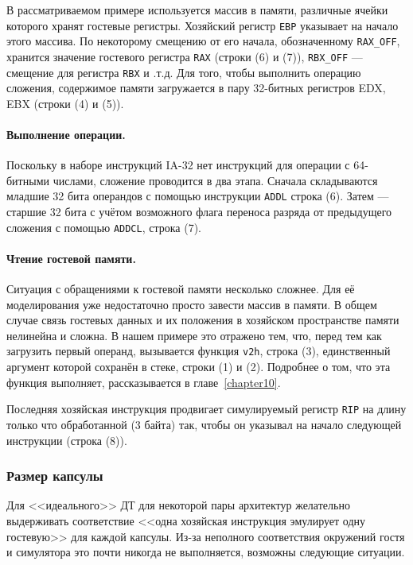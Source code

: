 В рассматриваемом примере используется массив в памяти, различные ячейки которого хранят гостевые регистры. Хозяйский регистр \texttt{EBP} указывает на начало этого массива. По некоторому смещению от его начала, обозначенному \texttt{RAX_OFF}, хранится значение гостевого регистра \texttt{RAX} (строки (6) и (7)), \texttt{RBX_OFF} --- смещение для регистра \texttt{RBX} и .т.д. Для того, чтобы выполнить операцию сложения, содержимое памяти загружается в пару 32-битных регистров EDX, EBX (строки (4) и (5)). 

\paragraph{Выполнение операции.}
Поскольку в наборе инструкций IA-32 нет инструкций для операции с 64-битными числами, сложение проводится в два этапа. Сначала складываются младшие 32 бита операндов с помощью инструкции \texttt{ADDL} строка (6). Затем --- старшие 32 бита с учётом возможного флага переноса разряда от предыдущего сложения с помощью \texttt{ADDCL}, строка (7).

\paragraph{Чтение гостевой памяти.}

Ситуация с обращениями к гостевой памяти несколько сложнее. Для её моделирования уже недостаточно просто завести массив в памяти. В общем случае связь гостевых данных и их положения в хозяйском пространстве памяти нелинейна и сложна. В нашем примере это отражено тем, что, перед тем как загрузить первый операнд, вызывается функция \texttt{v2h}, строка (3), единственный аргумент которой сохранён в стеке, строки (1) и (2). Подробнее о том, что эта функция выполняет, рассказывается в главе~\ref{chapter10}.

Последняя хозяйская инструкция продвигает симулируемый регистр \texttt{RIP} на длину только что обработанной (3 байта) так, чтобы он указывал на начало следующей инструкции (строка (8)).

\subsubsection{Размер капсулы}
Для <<идеального>> ДТ для некоторой пары архитектур желательно выдерживать соответствие <<одна хозяйская инструкция эмулирует одну гостевую>> для каждой капсулы. Из-за неполного соответствия окружений гостя и симулятора это почти никогда не выполняется, возможны следующие ситуации.

